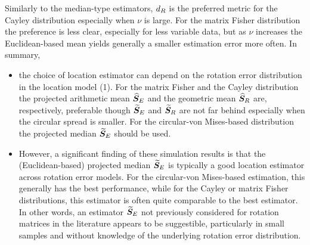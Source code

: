 Similarly to the median-type estimators, ${d_R}$ is the preferred metric for the Cayley distribution especially when $\nu$ is large.  For the  matrix Fisher distribution the preference is less clear, especially for less variable data, but as $\nu$ increases the Euclidean-based mean yields generally a smaller estimation error more often. In summary,
\begin{itemize}
\item the choice of location estimator can depend on the rotation error distribution in the location model (1).  For the matrix Fisher and the Cayley distribution  the projected arithmetic mean ${\widehat{\bm S}_E}$ and the geometric mean ${\widehat{\bm S}_R}$ are, respectively, preferable though ${\widetilde{\bm S}_E}$ and ${\widetilde{\bm S}_R}$ are not far behind especially when the circular spread is smaller. For the circular-von Mises-based distribution  the projected median ${\widetilde{\bm S}_E}$  should be used.

\item  However, a significant finding of these simulation results is that the (Euclidean-based)  projected median ${\widetilde{\bm S}_E}$ is typically a good location estimator across rotation error models.  For the circular-von Mises-based estimation, this generally has the best performance, while for the Cayley or matrix Fisher distributions, this estimator is often quite comparable to the best estimator.  In other words, an estimator ${\widetilde{\bm S}_E}$ not previously considered for rotation matrices in the literature appears to be suggestible, particularly in small samples and without knowledge of the underlying rotation error distribution.

\end{itemize}
